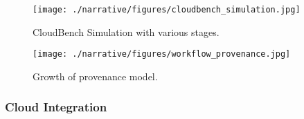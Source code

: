 %

\begin{figure}[thb]
\centering
\begin{minipage}{.6\textwidth}
  \centering
  \texttt{[image: ./narrative/figures/cloudbench\_simulation.jpg]}
  \caption{CloudBench Simulation with various stages.}
  \label{fig:cloudbench_simulation}
\end{minipage}%
\begin{minipage}{.4\textwidth}
  \centering
  \texttt{[image: ./narrative/figures/workflow\_provenance.jpg]}
  \caption{Growth of provenance model.}
  \label{fig:workflow_provenance}
\end{minipage}
\end{figure}

%

\subsubsection{Cloud Integration}
\label{sec:cloudinteg}

